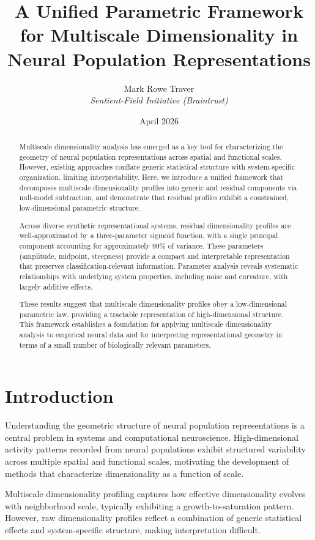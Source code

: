 \documentclass[11pt]{article}
\title{A Unified Parametric Framework for Multiscale Dimensionality in Neural Population Representations}
\author{Mark Rowe Traver\\[0.5em]
\textit{Sentient-Field Initiative (Braintrust)}}
\date{April 2026}
\begin{document}
\maketitle

\begin{abstract}
	Multiscale dimensionality analysis has emerged as a key tool for characterizing the geometry of neural population representations across spatial and functional scales. However, existing approaches conflate generic statistical structure with system-specific organization, limiting interpretability. Here, we introduce a unified framework that decomposes multiscale dimensionality profiles into generic and residual components via null-model subtraction, and demonstrate that residual profiles exhibit a constrained, low-dimensional parametric structure.

	Across diverse synthetic representational systems, residual dimensionality profiles are well-approximated by a three-parameter sigmoid function, with a single principal component accounting for approximately 99\% of variance. These parameters (amplitude, midpoint, steepness) provide a compact and interpretable representation that preserves classification-relevant information. Parameter analysis reveals systematic relationships with underlying system properties, including noise and curvature, with largely additive effects.

	These results suggest that multiscale dimensionality profiles obey a low-dimensional parametric law, providing a tractable representation of high-dimensional structure. This framework establishes a foundation for applying multiscale dimensionality analysis to empirical neural data and for interpreting representational geometry in terms of a small number of biologically relevant parameters.
\end{abstract}

\section{Introduction}

Understanding the geometric structure of neural population representations is a central problem in systems and computational neuroscience. High-dimensional activity patterns recorded from neural populations exhibit structured variability across multiple spatial and functional scales, motivating the development of methods that characterize dimensionality as a function of scale.

Multiscale dimensionality profiling captures how effective dimensionality evolves with neighborhood scale, typically exhibiting a growth-to-saturation pattern. However, raw dimensionality profiles reflect a combination of generic statistical effects and system-specific structure, making interpretation difficult.
\end{document}
